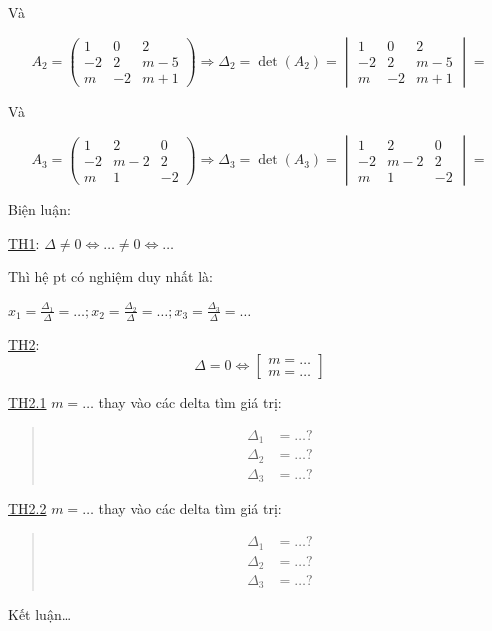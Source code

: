 \documentclass[
]{article}
\let\ul\uline
\begin{document}
Và

$$A_2 = \begin{pmatrix} 1 & 0 & 2 \\ -2 & 2 & m-5 \\ m & -2 & m+1 \end{pmatrix} \Rightarrow \Delta_2 = \det(A_2) = \begin{vmatrix} 1 & 0 & 2 \\ -2 & 2 & m-5 \\ m & -2 & m+1 \end{vmatrix} =$$

Và

$$A_3 = \begin{pmatrix} 1 & 2 & 0 \\ -2 & m-2 & 2 \\ m & 1 & -2 \end{pmatrix} \Rightarrow \Delta_3 = \det(A_3) = \begin{vmatrix} 1 & 2 & 0 \\ -2 & m-2 & 2 \\ m & 1 & -2 \end{vmatrix} =$$

Biện luận:

\ul{TH1}: $\Delta \neq 0 \Leftrightarrow \dots \neq 0 \Leftrightarrow \dots$

Thì hệ pt có nghiệm duy nhất là:

$x_1 = \frac{\Delta_1}{\Delta} = \dots ; x_2 = \frac{\Delta_2}{\Delta} = \dots ; x_3 = \frac{\Delta_3}{\Delta} = \dots$

\ul{TH2}: $$\Delta = 0 \Leftrightarrow \begin{bmatrix} m = \dots \\ m = \dots \end{bmatrix}$$

\ul{TH2.1} $m = \dots$
thay vào các delta tìm giá trị:

\begin{quote}
$$\begin{aligned} \Delta_1 &= \dots ? \\ \Delta_2 &= \dots ? \\ \Delta_3 &= \dots ? \end{aligned}$$
\end{quote}

\ul{TH2.2} $m = \dots$
thay vào các delta tìm giá trị:

\begin{quote}
$$\begin{aligned} \Delta_1 &= \dots ? \\ \Delta_2 &= \dots ? \\ \Delta_3 &= \dots ? \end{aligned}$$
\end{quote}

Kết luận\ldots{}
\end{document}
